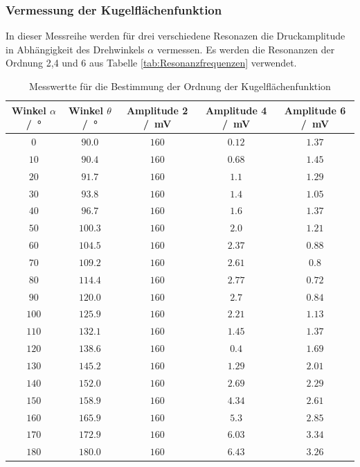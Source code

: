 \subsubsection{Vermessung der Kugelflächenfunktion}
In dieser Messreihe werden für drei verschiedene Resonazen die Druckamplitude in Abhängigkeit des Drehwinkels $\alpha$ vermessen.
Es werden die Resonanzen der Ordnung 2,4 und 6 aus Tabelle \ref{tab:Resonanzfrequenzen} verwendet.
\FloatBarrier
\begin{table}
    \centering
    \caption{Messwertte für die Bestimmung der Ordnung der Kugelflächenfunktion}
    \label{tab:Amplituden_Kugelflächenfunktion}
    \begin{tabular}{c c c c c}
        \toprule
        Winkel $\alpha$ /\SI{}{\degree}&Winkel $\theta$ /\SI{}{\degree}&Amplitude 2 /\SI{}{\milli\volt}&Amplitude 4 /\SI{}{\milli\volt}& Amplitude 6 /\SI{}{\milli\volt}\\
        \midrule
        $\num{0}$  &$\num{90.0}$  &$\num{160}$&$\num{0.12}$&$\num{1.37}$\\
        $\num{10}$ &$\num{90.4}$ &$\num{160}$&$\num{0.68}$&$\num{1.45}$\\
        $\num{20}$ &$\num{91.7}$ &$\num{160}$&$\num{1.1}$&$\num{1.29}$\\
        $\num{30}$ &$\num{93.8}$ &$\num{160}$&$\num{1.4}$&$\num{1.05}$\\
        $\num{40}$ &$\num{96.7}$ &$\num{160}$&$\num{1.6}$&$\num{1.37}$\\
        $\num{50}$ &$\num{100.3}$ &$\num{160}$&$\num{2.0}$&$\num{1.21}$\\
        $\num{60}$ &$\num{104.5}$ &$\num{160}$&$\num{2.37}$&$\num{0.88}$\\
        $\num{70}$ &$\num{109.2}$ &$\num{160}$&$\num{2.61}$&$\num{0.8}$\\
        $\num{80}$ &$\num{114.4}$ &$\num{160}$&$\num{2.77}$&$\num{0.72}$\\
        $\num{90}$ &$\num{120.0}$ &$\num{160}$&$\num{2.7}$&$\num{0.84}$\\
        $\num{100}$&$\num{125.9}$&$\num{160}$&$\num{2.21}$&$\num{1.13}$\\
        $\num{110}$&$\num{132.1}$&$\num{160}$&$\num{1.45}$&$\num{1.37}$\\
        $\num{120}$&$\num{138.6}$&$\num{160}$&$\num{0.4}$&$\num{1.69}$\\
        $\num{130}$&$\num{145.2}$&$\num{160}$&$\num{1.29}$&$\num{2.01}$\\
        $\num{140}$&$\num{152.0}$&$\num{160}$&$\num{2.69}$&$\num{2.29}$\\
        $\num{150}$&$\num{158.9}$&$\num{160}$&$\num{4.34}$&$\num{2.61}$\\
        $\num{160}$&$\num{165.9}$&$\num{160}$&$\num{5.3}$&$\num{2.85}$\\
        $\num{170}$&$\num{172.9}$&$\num{160}$&$\num{6.03}$&$\num{3.34}$\\
        $\num{180}$&$\num{180.0}$&$\num{160}$&$\num{6.43}$&$\num{3.26}$\\
        \bottomrule
    \end{tabular}
\end{table}
